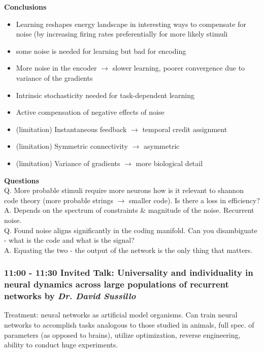 \documentclass[12pt]{article}
\begin{document}
\textbf{Conclusions}
\begin{itemize}
    \item Learning reshapes energy landscape in interesting ways to compensate for noise (by increasing firing rates preferentially for more likely stimuli
    \item some noise is needed for learning but bad for encoding
    \item More noise in the encoder $\rightarrow$ slower learning, poorer convergence due to variance of the gradients 
    \item Intrinsic stochasticity needed for task-dependent learning
    \item Active compensation of negative effects of noise
    \item (limitation) Instantaneous feedback $\rightarrow$ temporal credit assignment
    \item (limitation) Symmetric connectivity $\rightarrow$ asymmetric
    \item (limitation) Variance of gradients $\rightarrow$ more biological detail
\end{itemize}

\textbf{Questions} \\

Q. More probable stimuli require more neurons how is it relevant to shannon code theory (more probable strings $\rightarrow$ smaller code). Is there a loss in efficiency? \\ 

A. Depends on the spectrum of constraints \& magnitude of the noise. Recurrent noise. \\

Q. Found noise aligns significantly in the coding manifold. Can you disambiguate - what is the code and what is the signal? \\

A. Equating the two - the output of the network is the only thing that matters.


\subsubsection{11:00 - 11:30 Invited Talk: Universality and individuality in neural dynamics across large populations of recurrent networks by \textit{Dr. David Sussillo}}

Treatment: neural networks as artificial model organisms. Can train neural networks to accomplish tasks analogous to those studied in animals, full spec. of parameters (as opposed to brains), utilize optimization, reverse engineering, ability to conduct huge experiments. \\
\end{document}
